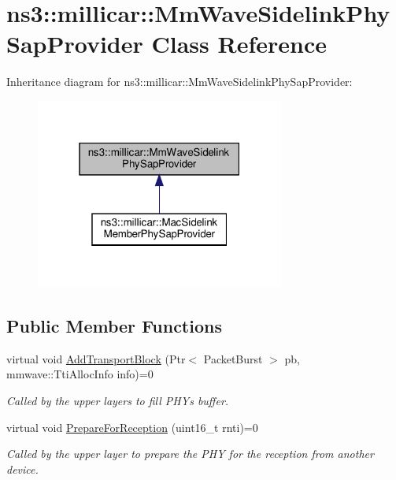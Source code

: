 \hypertarget{classns3_1_1millicar_1_1MmWaveSidelinkPhySapProvider}{}\section{ns3\+:\+:millicar\+:\+:Mm\+Wave\+Sidelink\+Phy\+Sap\+Provider Class Reference}
\label{classns3_1_1millicar_1_1MmWaveSidelinkPhySapProvider}


Inheritance diagram for ns3\+:\+:millicar\+:\+:Mm\+Wave\+Sidelink\+Phy\+Sap\+Provider\+:
\nopagebreak
\begin{figure}[H]
\begin{center}
\leavevmode
\includegraphics[width=232pt]{classns3_1_1millicar_1_1MmWaveSidelinkPhySapProvider__inherit__graph}
\end{center}
\end{figure}
\subsection*{Public Member Functions}
\begin{DoxyCompactItemize}
\item 
virtual void \hyperlink{classns3_1_1millicar_1_1MmWaveSidelinkPhySapProvider_acba80cb123b9eb0fcacefde35a91909d}{Add\+Transport\+Block} (Ptr$<$ Packet\+Burst $>$ pb, mmwave\+::\+Tti\+Alloc\+Info info)=0
\begin{DoxyCompactList}\small\item\em Called by the upper layers to fill P\+HY\textquotesingle{}s buffer. \end{DoxyCompactList}\item 
virtual void \hyperlink{classns3_1_1millicar_1_1MmWaveSidelinkPhySapProvider_a1c791fea7b4457a39428f3da49eaf6b8}{Prepare\+For\+Reception} (uint16\+\_\+t rnti)=0
\begin{DoxyCompactList}\small\item\em Called by the upper layer to prepare the P\+HY for the reception from another device. \end{DoxyCompactList}\end{DoxyCompactItemize}


